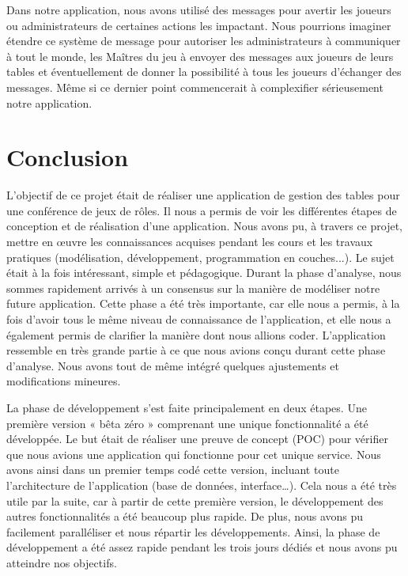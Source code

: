 \documentclass[11pt]{article}
\begin{document}
\bigbreak

Dans notre application, nous avons utilisé des messages pour avertir les joueurs ou administrateurs de certaines actions les impactant. Nous pourrions imaginer étendre ce système de message pour autoriser les administrateurs à communiquer à tout le monde, les Maîtres du jeu à envoyer des messages aux joueurs de leurs tables et éventuellement de donner la possibilité à tous les joueurs d'échanger des messages. Même si ce dernier point commencerait à complexifier sérieusement notre application.




\newpage
\section*{Conclusion}

L'objectif de ce projet était de réaliser une application de gestion des tables pour une conférence de jeux de rôles. Il nous a permis de voir les différentes étapes de conception et de réalisation d'une application. Nous avons pu, à travers ce projet, mettre en œuvre les connaissances acquises pendant les cours et les travaux pratiques (modélisation, développement, programmation en couches...). Le sujet était à la fois intéressant, simple et pédagogique. Durant la phase d'analyse, nous sommes rapidement arrivés à un consensus sur la manière de modéliser notre future application. Cette phase a été très importante, car elle nous a permis, à la fois d'avoir tous le même niveau de connaissance de l'application, et elle nous a également permis de clarifier la manière dont nous allions coder. L’application ressemble en très grande partie à ce que nous avions conçu durant cette phase d’analyse. Nous avons tout de même intégré quelques ajustements et modifications mineures.

\bigbreak

La phase de développement s’est faite principalement en deux étapes. Une première version « bêta zéro » comprenant une unique fonctionnalité a été développée. Le but était de réaliser une preuve de concept (POC) pour vérifier que nous avions une application qui fonctionne pour cet unique service. Nous avons ainsi dans un premier temps codé cette version, incluant toute l’architecture de l’application (base de données, interface…). Cela nous a été très utile par la suite, car à partir de cette première version, le développement des autres fonctionnalités a été beaucoup plus rapide. De plus, nous avons pu facilement paralléliser et nous répartir les développements. Ainsi, la phase de développement a été assez rapide pendant les trois jours dédiés et nous avons pu atteindre nos objectifs.
\end{document}
